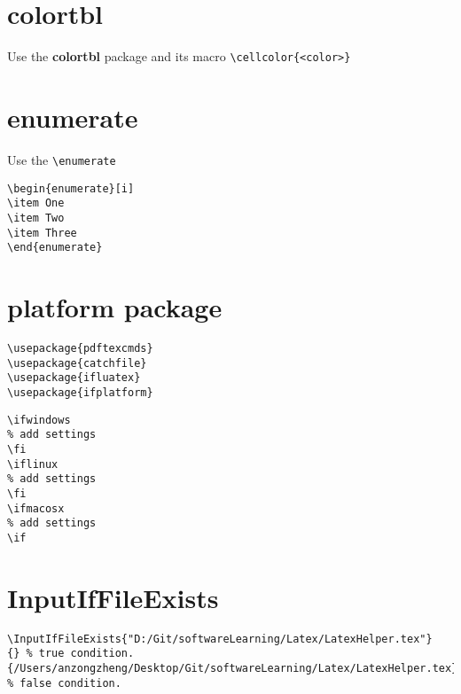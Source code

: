 \section{colortbl}
Use the \textbf{colortbl} package and its macro \lstinline[language={[LaTeX]TeX}]|\cellcolor{<color>}|

\section{enumerate}
Use the \lstinline[language={[LaTeX]TeX}]|\enumerate|

\begin{lstlisting}[language={[LaTeX]TeX}]
\begin{enumerate}[i]
\item One
\item Two
\item Three
\end{enumerate}
\end{lstlisting}

\section{platform package}

\begin{lstlisting}[language={[LaTeX]TeX}]
% packages we need
\usepackage{pdftexcmds}
\usepackage{catchfile}
\usepackage{ifluatex}
\usepackage{ifplatform}
\end{lstlisting}

\begin{lstlisting}[language={[LaTeX]TeX}]
\ifwindows
% add settings
\fi
\iflinux
% add settings
\fi
\ifmacosx
% add settings
\if
\end{lstlisting}

\section{InputIfFileExists}
\begin{lstlisting}[language={[LaTeX]TeX}]
\InputIfFileExists{"D:/Git/softwareLearning/Latex/LatexHelper.tex"}
{} % true condition.
{/Users/anzongzheng/Desktop/Git/softwareLearning/Latex/LatexHelper.tex} % false condition.
\end{lstlisting}
